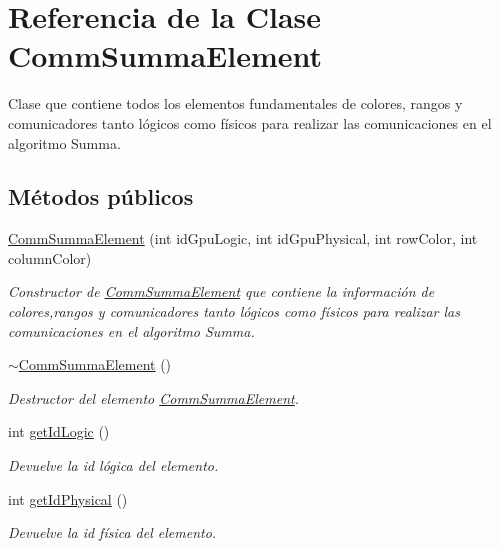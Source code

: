 \hypertarget{classCommSummaElement}{}\section{Referencia de la Clase Comm\+Summa\+Element}
\label{classCommSummaElement}


Clase que contiene todos los elementos fundamentales de colores, rangos y comunicadores tanto lógicos como físicos para realizar las comunicaciones en el algoritmo Summa.  


\subsection*{Métodos públicos}
\begin{DoxyCompactItemize}
\item 
\hyperlink{classCommSummaElement_ace51fafb58d6b18fc54cedb3a30e5bbb}{Comm\+Summa\+Element} (int id\+Gpu\+Logic, int id\+Gpu\+Physical, int row\+Color, int column\+Color)
\begin{DoxyCompactList}\small\item\em Constructor de \hyperlink{classCommSummaElement}{Comm\+Summa\+Element} que contiene la información de colores,rangos y comunicadores tanto lógicos como físicos para realizar las comunicaciones en el algoritmo Summa. \end{DoxyCompactList}\item 
\mbox{\label{classCommSummaElement_afbfc75f7d70d548bc7578812ba6ac3db}} 
\hyperlink{classCommSummaElement_afbfc75f7d70d548bc7578812ba6ac3db}{$\sim$\+Comm\+Summa\+Element} ()
\begin{DoxyCompactList}\small\item\em Destructor del elemento \hyperlink{classCommSummaElement}{Comm\+Summa\+Element}. \end{DoxyCompactList}\item 
int \hyperlink{classCommSummaElement_a1bd393be15ce4d1336dd8b34519a7e33}{get\+Id\+Logic} ()
\begin{DoxyCompactList}\small\item\em Devuelve la id lógica del elemento. \end{DoxyCompactList}\item 
int \hyperlink{classCommSummaElement_aa4ff458b5c0f865765b02ccc7a4ec84f}{get\+Id\+Physical} ()
\begin{DoxyCompactList}\small\item\em Devuelve la id física del elemento. \end{DoxyCompactList}\item 

\end{DoxyCompactItemize}

